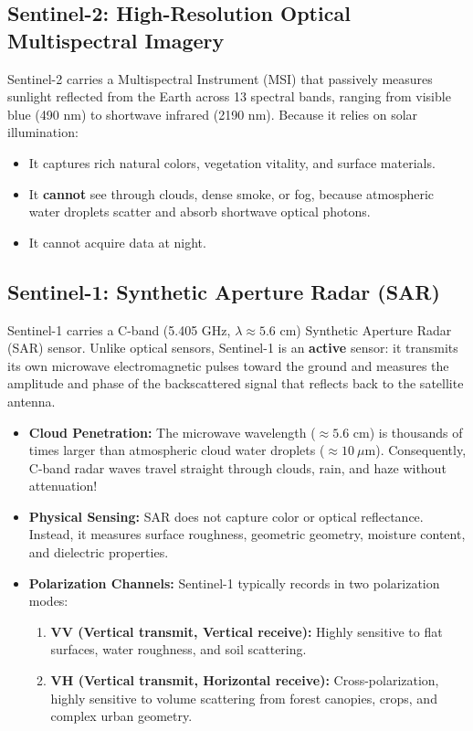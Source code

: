 \subsection{Sentinel-2: High-Resolution Optical Multispectral Imagery}
Sentinel-2 carries a Multispectral Instrument (MSI) that passively measures sunlight reflected from the Earth across 13 spectral bands, ranging from visible blue (490 nm) to shortwave infrared (2190 nm). Because it relies on solar illumination:
\begin{itemize}
    \item It captures rich natural colors, vegetation vitality, and surface materials.
    \item It \textbf{cannot} see through clouds, dense smoke, or fog, because atmospheric water droplets scatter and absorb shortwave optical photons.
    \item It cannot acquire data at night.
\end{itemize}

\subsection{Sentinel-1: Synthetic Aperture Radar (SAR)}
Sentinel-1 carries a C-band (5.405 GHz, $\lambda \approx 5.6\text{ cm}$) Synthetic Aperture Radar (SAR) sensor. Unlike optical sensors, Sentinel-1 is an \textbf{active} sensor: it transmits its own microwave electromagnetic pulses toward the ground and measures the amplitude and phase of the backscattered signal that reflects back to the satellite antenna.
\begin{itemize}
    \item \textbf{Cloud Penetration:} The microwave wavelength ($\approx 5.6\text{ cm}$) is thousands of times larger than atmospheric cloud water droplets ($\approx 10\ \mu\text{m}$). Consequently, C-band radar waves travel straight through clouds, rain, and haze without attenuation!
    \item \textbf{Physical Sensing:} SAR does not capture color or optical reflectance. Instead, it measures surface roughness, geometric geometry, moisture content, and dielectric properties.
    \item \textbf{Polarization Channels:} Sentinel-1 typically records in two polarization modes:
    \begin{enumerate}
        \item \textbf{VV (Vertical transmit, Vertical receive):} Highly sensitive to flat surfaces, water roughness, and soil scattering.
        \item \textbf{VH (Vertical transmit, Horizontal receive):} Cross-polarization, highly sensitive to volume scattering from forest canopies, crops, and complex urban geometry.
    \end{enumerate}
\end{itemize}


